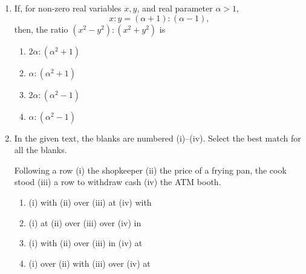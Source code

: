 \documentclass[journal]{IEEEtran}
\numberwithin{equation}{enumi}
\numberwithin{figure}{enumi}
\begin{document}
\begin{enumerate}
    \item If, for non-zero real variables \( x, y \), and real parameter \( \alpha > 1 \),
    \[
    x : y = (\alpha + 1) : (\alpha - 1),
    \]
    then, the ratio \( (x^2 - y^2) : (x^2 + y^2) \) is

    \begin{enumerate}
        \item \( 2\alpha : (\alpha^2 + 1) \)
        \item \( \alpha : (\alpha^2 + 1) \)
        \item \( 2\alpha : (\alpha^2 - 1) \)
        \item \( \alpha : (\alpha^2 - 1) \)
    \end{enumerate}
\item In the given text, the blanks are numbered (i)--(iv). Select the best match for all the blanks.

Following a row \underline{\hspace{1cm}} (i) the shopkeeper \underline{\hspace{1cm}} (ii) the price of a frying pan, the cook stood \underline{\hspace{1cm}} (iii) a row to withdraw cash \underline{\hspace{1cm}} (iv) the ATM booth.
\begin{enumerate}
    \item (i) with \hspace{1em} (ii) over \hspace{1em} (iii) at \hspace{1em} (iv) with
    \item (i) at \hspace{1em} (ii) over \hspace{1em} (iii) over \hspace{1em} (iv) in
    \item (i) with \hspace{1em} (ii) over \hspace{1em} (iii) in \hspace{1em} (iv) at
    \item (i) over \hspace{1em} (ii) with \hspace{1em} (iii) over \hspace{1em} (iv) at
\end{enumerate}


\end{enumerate}
\end{document}
